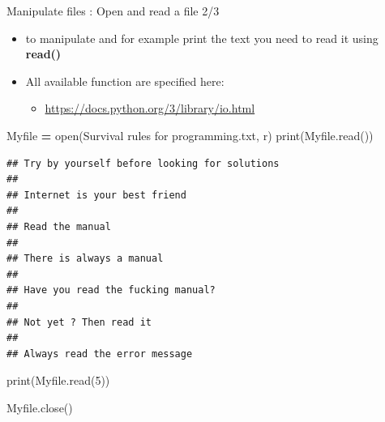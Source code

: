\documentclass[
  8pt,
  ignorenonframetext,
]{beamer}
\newenvironment{Shaded}{\begin{snugshade}}{\end{snugshade}}
\newcommand{\BuiltInTok}[1]{#1}
\newcommand{\DecValTok}[1]{\textcolor[rgb]{0.00,0.00,0.81}{#1}}
\newcommand{\NormalTok}[1]{#1}
\newcommand{\OperatorTok}[1]{\textcolor[rgb]{0.81,0.36,0.00}{\textbf{#1}}}
\newcommand{\StringTok}[1]{\textcolor[rgb]{0.31,0.60,0.02}{#1}}
\providecommand{\tightlist}{%
  \setlength{\itemsep}{0pt}\setlength{\parskip}{0pt}}
\begin{document}
\begin{frame}[fragile]{Manipulate files : Open and read a file 2/3}
\protect\hypertarget{manipulate-files-open-and-read-a-file-23}{}
\begin{itemize}
\item
  to manipulate and for example print the text you need to read it using
  \textbf{read()}
\item
  All available function are specified here:

  \begin{itemize}
  \tightlist
  \item
    \url{https://docs.python.org/3/library/io.html}
  \end{itemize}
\end{itemize}

\begin{Shaded}
\begin{Highlighting}[]
\NormalTok{Myfile }\OperatorTok{=} \BuiltInTok{open}\NormalTok{(}\StringTok{\textquotesingle{}Survival rules for programming.txt\textquotesingle{}}\NormalTok{, }\StringTok{\textquotesingle{}r\textquotesingle{}}\NormalTok{)}
\BuiltInTok{print}\NormalTok{(Myfile.read())}
\end{Highlighting}
\end{Shaded}

\begin{verbatim}
## Try by yourself before looking for solutions
## 
## Internet is your best friend
## 
## Read the manual
## 
## There is always a manual
## 
## Have you read the fucking manual?
## 
## Not yet ? Then read it
## 
## Always read the error message
\end{verbatim}

\begin{Shaded}
\begin{Highlighting}[]
\BuiltInTok{print}\NormalTok{(Myfile.read(}\DecValTok{5}\NormalTok{))}
\end{Highlighting}
\end{Shaded}

\begin{Shaded}
\begin{Highlighting}[]
\NormalTok{Myfile.close()}
\end{Highlighting}
\end{Shaded}
\end{frame}
\end{document}
